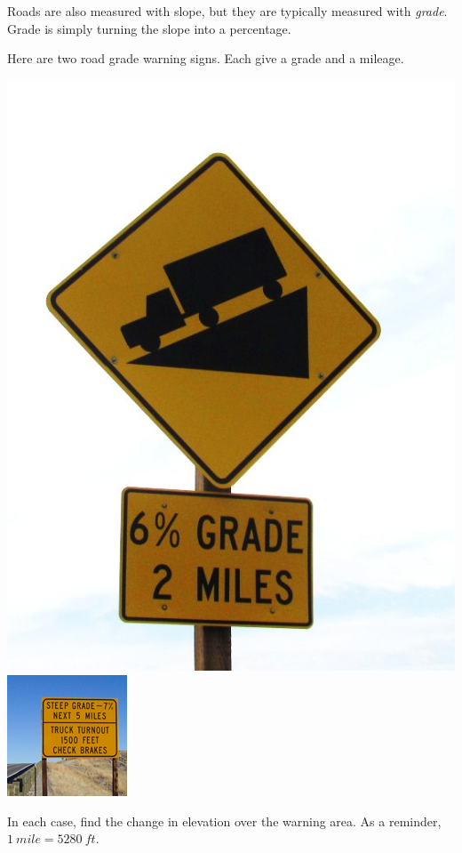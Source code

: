 \documentclass[noauthor,nooutcomes,hints,handout]{../ximera}
\begin{document}
\begin{question}
Roads are also measured with slope, but they are typically measured with \emph{grade}. Grade is simply turning the slope into a percentage.

Here are two road grade warning signs. Each give a grade and a mileage. 

\includegraphics[width=.4\textwidth]{gradeWarning}
\includegraphics[width=.3\textwidth]{truckGradeWarning}

In each case, find the change in elevation over the warning area. As a reminder, $1\ mile=5280\ ft.$
\end{question}
\end{document}
